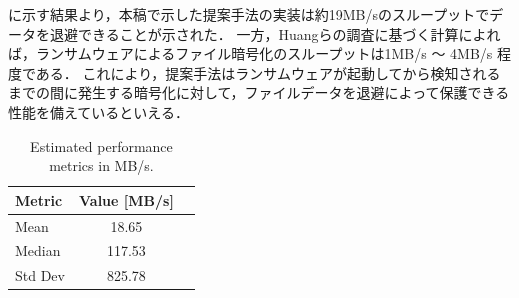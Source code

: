 に示す結果より，本稿で示した提案手法の実装は約19MB/sのスループットでデータを退避できることが示された．
一方，Huangら\cite{huang2017flashguard}の調査に基づく計算によれば，ランサムウェアによるファイル暗号化のスループットは1MB/s ～ 4MB/s 程度である．
これにより，提案手法はランサムウェアが起動してから検知されるまでの間に発生する暗号化に対して，ファイルデータを退避によって保護できる性能を備えているといえる．

\begin{table}[t]
  \centering
  \caption{Estimated performance metrics in MB/s.}
  \begin{tabular}{lcc}
    \hline
    Metric  & Value [MB/s] \\
    \hline
    Mean    & 18.65        \\
    Median  & 117.53       \\
    Std Dev & 825.78       \\
    \hline
  \end{tabular}
  \label{tab:performance_metrics}
\end{table}
